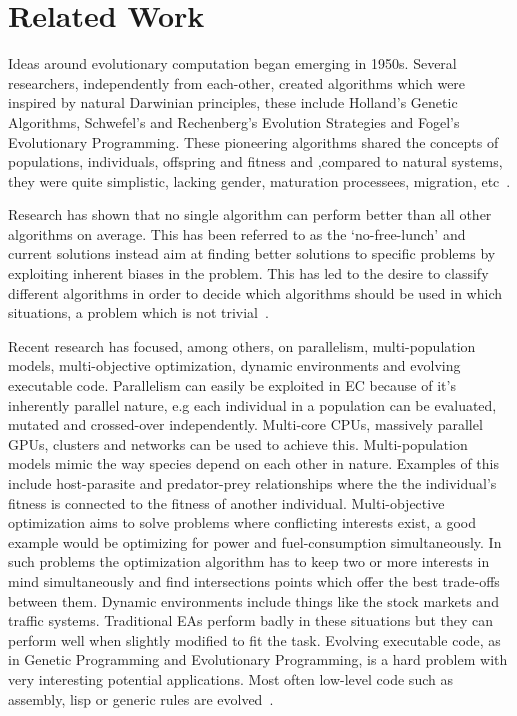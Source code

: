 \section{Related Work}

Ideas around evolutionary computation began emerging in 1950s. Several researchers, independently from each-other, created algorithms which were inspired by natural Darwinian principles, these include Holland's Genetic Algorithms, Schwefel's and Rechenberg's Evolution Strategies and Fogel's Evolutionary Programming. These pioneering algorithms shared the concepts of populations, individuals, offspring and fitness and ,compared to natural systems, they were quite simplistic, lacking gender, maturation processees, migration, etc~\cite{dejong2009EC}.

Research has shown that no single algorithm can perform better than all other algorithms on average. This has been referred to as the `no-free-lunch' and current solutions instead aim at finding better solutions to specific problems by exploiting inherent biases in the problem. This has led to the desire to classify different algorithms in order to decide which algorithms should be used in which situations, a problem which is not trivial~\cite{dejong2009EC}.

Recent research has focused, among others, on parallelism, multi-population models, multi-objective optimization, dynamic environments and evolving executable code. Parallelism can easily be exploited in EC because of it's inherently parallel nature, e.g each individual in a population can be evaluated, mutated and crossed-over independently. Multi-core CPUs, massively parallel GPUs, clusters and networks can be used to achieve this. Multi-population models mimic the way species depend on each other in nature. Examples of this include host-parasite and predator-prey relationships where the the individual's fitness is connected to the fitness of another individual. Multi-objective optimization aims to solve problems where conflicting interests exist, a good example would be optimizing for power and fuel-consumption simultaneously. In such problems the optimization algorithm has to keep two or more interests in mind simultaneously and find intersections points which offer the best trade-offs between them. Dynamic environments include things like the stock markets and traffic systems. Traditional EAs perform badly in these situations but they can perform well when slightly modified to fit the task. Evolving executable code, as in Genetic Programming and Evolutionary Programming, is a hard problem with very interesting potential applications. Most often low-level code such as assembly, lisp or generic rules are evolved~\cite{dejong2009EC}.

